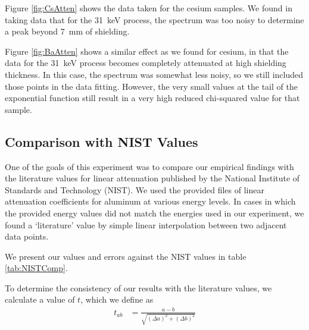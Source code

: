 \documentclass[letter]{article}
\begin{document}

Figure \ref{fig:CsAtten} shows the data taken for the cesium samples. We found in taking data that for the \qty{31}{\kilo\electronvolt} process, the spectrum was too noisy to determine a peak beyond \qty{7}{\mm} of shielding.


Figure \ref{fig:BaAtten} shows a similar effect as we found for cesium, in that the data for the \qty{31}{\kilo\electronvolt} process becomes completely attenuated at high shielding thickness. In this case, the spectrum was somewhat less noisy, so we still included those points in the data fitting. However, the very small values at the tail of the exponential function still result in a very high reduced chi-squared value for that sample.


\subsection{Comparison with NIST Values}

One of the goals of this experiment was to compare our empirical findings with the literature values for linear attenuation published by the National Institute of Standards and Technology (NIST). We used the provided files of linear attenuation coefficients for aluminum at various energy levels. In cases in which the provided energy values did not match the energies used in our experiment, we found a `literature' value by simple linear interpolation between two adjacent data points.

We present our values and errors against the NIST values in table \ref{tab:NISTComp}.


To determine the consistency of our results with the literature values, we calculate a value of $t$, which we define as
\begin{align}
t_{ab}
&=
\frac{a - b}{\sqrt{ (\Delta a)^2 + (\Delta b)^2 }}
\end{align}

\end{document}
